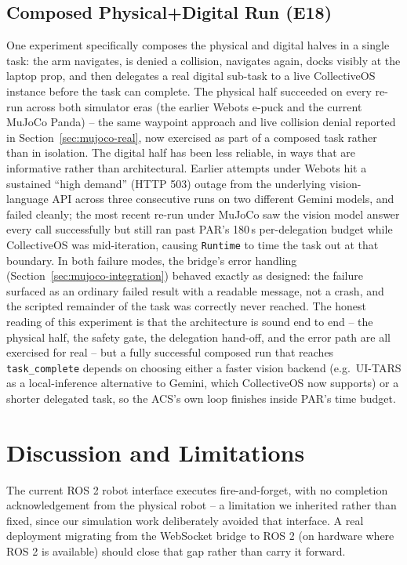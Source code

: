 \documentclass[conference]{IEEEtran}
\begin{document}
\subsection{Composed Physical+Digital Run (E18)}
\label{sec:e18}
One experiment specifically composes the physical and digital halves in a single task: the arm
navigates, is denied a collision, navigates again, docks visibly at the laptop prop, and then delegates a
real digital sub-task to a live CollectiveOS instance before the task can complete. The physical half
succeeded on every re-run across both simulator eras (the earlier Webots e-puck and the current MuJoCo
Panda) -- the same waypoint approach and live collision denial reported in Section~\ref{sec:mujoco-real},
now exercised as part of a composed task rather than in isolation. The digital half has been less
reliable, in ways that are informative rather than architectural. Earlier attempts under Webots hit a
sustained ``high demand'' (HTTP 503) outage from the underlying vision-language API across three
consecutive runs on two different Gemini models, and failed cleanly; the most recent re-run under MuJoCo
saw the vision model answer every call successfully but still ran past PAR's 180\,s per-delegation budget
while CollectiveOS was mid-iteration, causing \texttt{Runtime} to time the task out at that boundary.
In both failure modes, the bridge's error handling (Section~\ref{sec:mujoco-integration}) behaved exactly
as designed: the failure surfaced as an ordinary failed result with a readable message, not a crash, and
the scripted remainder of the task was correctly never reached. The honest reading of this experiment is
that the architecture is sound end to end -- the physical half, the safety gate, the delegation
hand-off, and the error path are all exercised for real -- but a fully successful composed run that
reaches \texttt{task\_complete} depends on choosing either a faster vision backend (e.g.\ UI-TARS as a
local-inference alternative to Gemini, which CollectiveOS now supports) or a shorter delegated task, so
the ACS's own loop finishes inside PAR's time budget.

\section{Discussion and Limitations}
The current ROS 2 robot interface executes fire-and-forget, with no completion acknowledgement from the
physical robot -- a limitation we inherited rather than fixed, since our simulation work deliberately avoided
that interface. A real deployment migrating from the WebSocket bridge to ROS 2 (on hardware where ROS 2
is available) should close that gap rather than carry it forward.
\end{document}
